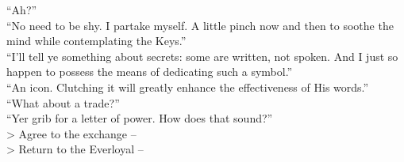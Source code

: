 “Ah?”\\

“No need to be shy. I partake myself. A little pinch now and then to soothe the mind while contemplating the Keys.”\\

“I’ll tell ye something about secrets: some are written, not spoken. And I just so happen to possess the means of dedicating such a symbol.”\\

“An icon. Clutching it will greatly enhance the effectiveness of His words.”\\

“What about a trade?”\\

“Yer grib for a letter of power. How does that sound?”\\

> Agree to the exchange -- \\
> Return to the Everloyal -- 